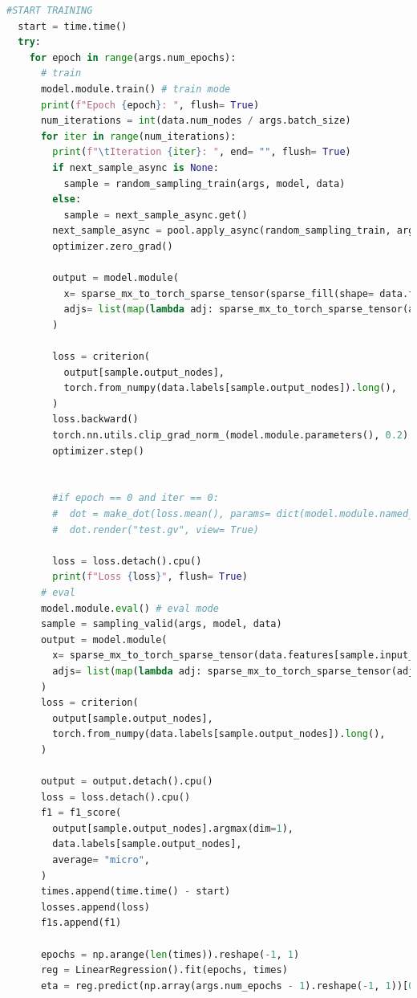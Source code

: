 \begin{lstlisting}[language=Python, caption= Training code, label=ls:train_code]
  #START TRAINING
  start = time.time()
  try:
    for epoch in range(args.num_epochs):
      # train
      model.module.train() # train mode
      print(f"Epoch {epoch}: ", flush= True)
      num_iterations = int(data.num_nodes / args.batch_size)
      for iter in range(num_iterations):
        print(f"\tIteration {iter}: ", end= "", flush= True)
        if next_sample_async is None:
          sample = random_sampling_train(args, model, data)
        else:
          sample = next_sample_async.get()
        next_sample_async = pool.apply_async(random_sampling_train, args= (args, model, data))
        optimizer.zero_grad()
        
        output = model.module(
          x= sparse_mx_to_torch_sparse_tensor(sparse_fill(shape= data.features.shape, mx= data.features[sample.input_nodes], row= sample.input_nodes)),
          adjs= list(map(lambda adj: sparse_mx_to_torch_sparse_tensor(adj).to(device), sample.adjs)),
        )

        loss = criterion(
          output[sample.output_nodes],
          torch.from_numpy(data.labels[sample.output_nodes]).long(),
        )
        loss.backward()
        torch.nn.utils.clip_grad_norm_(model.module.parameters(), 0.2)
        optimizer.step()


        #if epoch == 0 and iter == 0:
        #  dot = make_dot(loss.mean(), params= dict(model.module.named_parameters()))
        #  dot.render("test.gv", view= True)

        loss = loss.detach().cpu()
        print(f"Loss {loss}", flush= True)
      # eval
      model.module.eval() # eval mode
      sample = sampling_valid(args, model, data)
      output = model.module(
        x= sparse_mx_to_torch_sparse_tensor(data.features[sample.input_nodes]),
        adjs= list(map(lambda adj: sparse_mx_to_torch_sparse_tensor(adj).to(device), sample.adjs)),
      )
      loss = criterion(
        output[sample.output_nodes],
        torch.from_numpy(data.labels[sample.output_nodes]).long(),
      )
      
      output = output.detach().cpu()
      loss = loss.detach().cpu()
      f1 = f1_score(
        output[sample.output_nodes].argmax(dim=1),
        data.labels[sample.output_nodes],
        average= "micro",
      )
      times.append(time.time() - start)
      losses.append(loss)
      f1s.append(f1)

      epochs = np.arange(len(times)).reshape(-1, 1)
      reg = LinearRegression().fit(epochs, times)
      eta = reg.predict(np.array(args.num_epochs - 1).reshape(-1, 1))[0]
      

\end{lstlisting}
